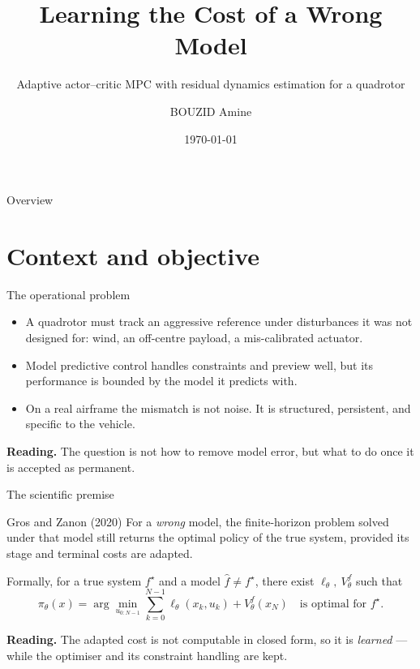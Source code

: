 \documentclass[10pt]{beamer}
\title{Learning the Cost of a Wrong Model}
\subtitle{Adaptive actor--critic MPC with residual dynamics estimation
  for a quadrotor}
\author{BOUZID Amine}
\institute{Final-year project (PFE)}
\date{\today}
\newcommand{\takeaway}[1]{\par\vfill{\footnotesize\textbf{Reading.} #1\par}}
\begin{document}
\begin{frame}
  \titlepage
\end{frame}

\begin{frame}{Overview}
  \small
  \tableofcontents
\end{frame}

\section{Context and objective}

\begin{frame}{The operational problem}
  \begin{itemize}
    \item A quadrotor must track an aggressive reference under disturbances
      it was not designed for: wind, an off-centre payload, a mis-calibrated
      actuator.
    \item Model predictive control handles constraints and preview well, but
      its performance is bounded by the model it predicts with.
    \item On a real airframe the mismatch is not noise. It is structured,
      persistent, and specific to the vehicle.
  \end{itemize}
  \takeaway{The question is not how to remove model error, but what to do
    once it is accepted as permanent.}
\end{frame}

\begin{frame}{The scientific premise}
  \begin{block}{Gros and Zanon (2020)}
    For a \emph{wrong} model, the finite-horizon problem solved under that
    model still returns the optimal policy of the true system, provided its
    stage and terminal costs are adapted.
  \end{block}
  \vspace{4pt}
  Formally, for a true system $f^{\star}$ and a model $\hat f\neq f^{\star}$,
  there exist $\ell_\theta,\ V^f_\theta$ such that
  \[
    \pi_\theta(x)=\arg\min_{u_{0:N-1}}
      \sum_{k=0}^{N-1}\ell_\theta(x_k,u_k)+V^f_\theta(x_N)
    \quad\text{is optimal for } f^{\star}.
  \]
  \takeaway{The adapted cost is not computable in closed form, so it is
    \emph{learned} --- while the optimiser and its constraint handling are
    kept.}
\end{frame}
\end{document}
